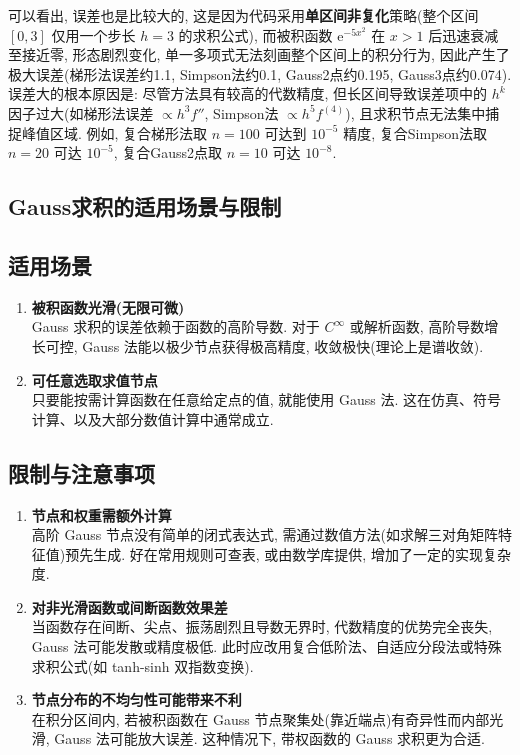\documentclass[12pt,a4paper]{ctexart}
\begin{document}
可以看出, 误差也是比较大的, 这是因为代码采用\textbf{单区间非复化}策略(整个区间 $[0,3]$ 仅用一个步长 $h=3$ 的求积公式), 而被积函数 $\mathrm{e}^{-5x^2}$ 在 $x>1$ 后迅速衰减至接近零, 形态剧烈变化, 单一多项式无法刻画整个区间上的积分行为, 因此产生了极大误差(梯形法误差约1.1, Simpson法约0.1, Gauss2点约0.195, Gauss3点约0.074). 误差大的根本原因是: 尽管方法具有较高的代数精度, 但长区间导致误差项中的 $h^k$ 因子过大(如梯形法误差 $\propto h^3 f''$, Simpson法 $\propto h^5 f^{(4)}$), 且求积节点无法集中捕捉峰值区域. 例如, 复合梯形法取 $n=100$ 可达到 $10^{-5}$ 精度, 复合Simpson法取 $n=20$ 可达 $10^{-5}$, 复合Gauss2点取 $n=10$ 可达 $10^{-8}$. 

\subsection{Gauss求积的适用场景与限制}

\subsection*{适用场景}

\begin{enumerate}
\item \textbf{被积函数光滑(无限可微)} \\
  Gauss 求积的误差依赖于函数的高阶导数. 对于 \(C^\infty\) 或解析函数, 高阶导数增长可控, Gauss 法能以极少节点获得极高精度, 收敛极快(理论上是谱收敛). 

\item \textbf{可任意选取求值节点} \\
  只要能按需计算函数在任意给定点的值, 就能使用 Gauss 法. 这在仿真、符号计算、以及大部分数值计算中通常成立. 
\end{enumerate}

\subsection*{限制与注意事项}

\begin{enumerate}
\item \textbf{节点和权重需额外计算} \\
  高阶 Gauss 节点没有简单的闭式表达式, 需通过数值方法(如求解三对角矩阵特征值)预先生成. 好在常用规则可查表, 或由数学库提供, 增加了一定的实现复杂度. 

\item \textbf{对非光滑函数或间断函数效果差} \\
  当函数存在间断、尖点、振荡剧烈且导数无界时, 代数精度的优势完全丧失, Gauss 法可能发散或精度极低. 此时应改用复合低阶法、自适应分段法或特殊求积公式(如 tanh-sinh 双指数变换). 

\item \textbf{节点分布的不均匀性可能带来不利} \\
  在积分区间内, 若被积函数在 Gauss 节点聚集处(靠近端点)有奇异性而内部光滑, Gauss 法可能放大误差. 这种情况下, 带权函数的 Gauss 求积更为合适. 
\end{enumerate}
\end{document}
